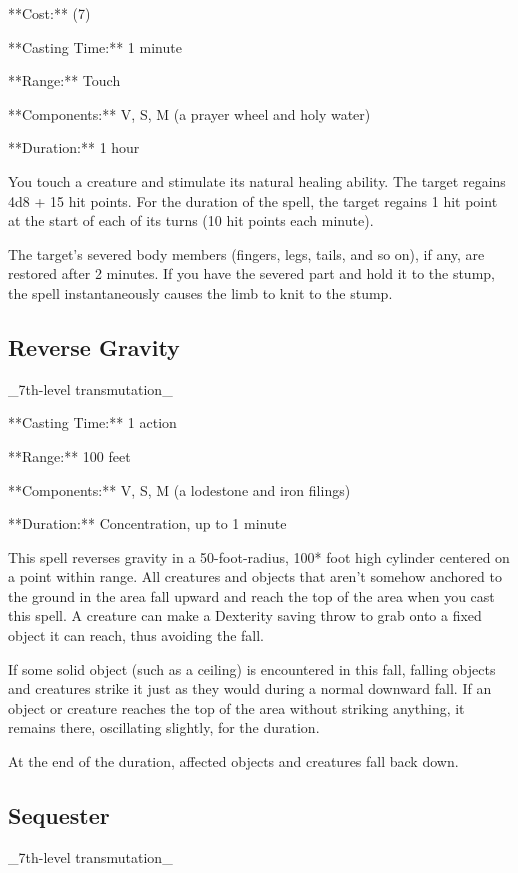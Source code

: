 **Cost:** (7)

**Casting Time:** 1 minute

**Range:** Touch

**Components:** V, S, M (a prayer wheel and holy water)

**Duration:** 1 hour

You touch a creature and stimulate its natural healing ability. The target regains 4d8 + 15 hit points. For the duration of the spell, the target regains 1 hit point at the start of each of its turns (10 hit points each minute).

The target’s severed body members (fingers, legs, tails, and so on), if any, are restored after 2 minutes. If you have the severed part and hold it to the stump, the spell instantaneously causes the limb to knit to the stump.


\subsection{Reverse Gravity}

_7th-level transmutation_

**Casting Time:** 1 action

**Range:** 100 feet

**Components:** V, S, M (a lodestone and iron filings)

**Duration:** Concentration, up to 1 minute

This spell reverses gravity in a 50-foot-radius, 100* foot high cylinder centered on a point within range. All creatures and objects that aren’t somehow anchored to the ground in the area fall upward and reach the top of the area when you cast this spell. A creature can make a Dexterity saving throw to grab onto a fixed object it can reach, thus avoiding the fall.

If some solid object (such as a ceiling) is encountered in this fall, falling objects and creatures strike it just as they would during a normal downward fall. If an object or creature reaches the top of the area without striking anything, it remains there, oscillating slightly, for the duration.

At the end of the duration, affected objects and creatures fall back down.

\subsection{Sequester}

_7th-level transmutation_

